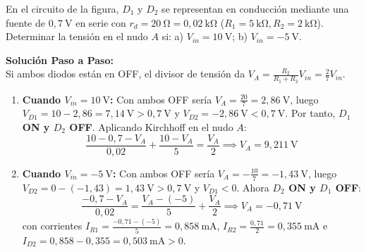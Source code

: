 \begin{ejercicio}
En el circuito de la figura, $D_1$ y $D_2$ se representan en conducción mediante una fuente de $0{,}7\ \si{\volt}$ en serie con $r_d = 20\ \si{\ohm} = 0{,}02\ \si{\kilo\ohm}$ ($R_1 = 5\ \si{\kilo\ohm}, R_2 = 2\ \si{\kilo\ohm}$). Determinar la tensión en el nudo $A$ si: a) $V_{in} = 10\ \si{\volt}$; \quad b) $V_{in} = -5\ \si{\volt}$.
\tcbline
\begin{center}
\end{center}
\textbf{Solución Paso a Paso:}\\[4pt]
Si ambos diodos están en OFF, el divisor de tensión da $V_A = \frac{R_2}{R_1 + R_2} V_{in} = \frac{2}{7} V_{in}$.
\begin{enumerate}[label=\alph*)]
    \item \textbf{Cuando $V_{in} = 10\ \si{\volt}$:} Con ambos OFF sería $V_A = \frac{20}{7} = 2{,}86\ \si{\volt}$, luego $V_{D1} = 10 - 2{,}86 = 7{,}14\ \si{\volt} > 0{,}7\ \si{\volt}$ y $V_{D2} = -2{,}86\ \si{\volt} < 0{,}7\ \si{\volt}$. Por tanto, \textbf{$D_1$ ON y $D_2$ OFF}. Aplicando Kirchhoff en el nudo $A$:
    \begin{equation}
        \frac{10 - 0{,}7 - V_A}{0{,}02} + \frac{10 - V_A}{5} = \frac{V_A}{2} \implies V_A = 9{,}211\ \si{\volt}
    \end{equation}
    \item \textbf{Cuando $V_{in} = -5\ \si{\volt}$:} Con ambos OFF sería $V_A = -\frac{10}{7} = -1{,}43\ \si{\volt}$, luego $V_{D2} = 0 - (-1{,}43) = 1{,}43\ \si{\volt} > 0{,}7\ \si{\volt}$ y $V_{D1} < 0$. Ahora \textbf{$D_2$ ON y $D_1$ OFF}:
    \begin{equation}
        \frac{-0{,}7 - V_A}{0{,}02} = \frac{V_A - (-5)}{5} + \frac{V_A}{2} \implies V_A = -0{,}71\ \si{\volt}
    \end{equation}
    con corrientes $I_{R1} = \frac{-0{,}71 - (-5)}{5} = 0{,}858\ \si{\milli\ampere}$, $I_{R2} = \frac{0{,}71}{2} = 0{,}355\ \si{\milli\ampere}$ e $I_{D2} = 0{,}858 - 0{,}355 = 0{,}503\ \si{\milli\ampere} > 0$.
\end{enumerate}
\end{ejercicio}

